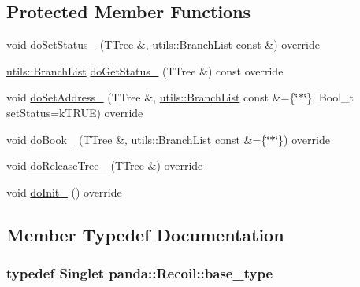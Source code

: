 \subsection*{Protected Member Functions}
\begin{DoxyCompactItemize}
\item 
void \hyperlink{classpanda_1_1Recoil_a68fa34c56d13dae0010ad93e1092ca4f}{doSetStatus\_\-} (TTree \&, \hyperlink{classpanda_1_1utils_1_1BranchList}{utils::BranchList} const \&) override
\item 
\hyperlink{classpanda_1_1utils_1_1BranchList}{utils::BranchList} \hyperlink{classpanda_1_1Recoil_ad20acbe1a9a80eabffbab6bca8d99d24}{doGetStatus\_\-} (TTree \&) const override
\item 
void \hyperlink{classpanda_1_1Recoil_a5e8d6c728a38c695643399c984eff1de}{doSetAddress\_\-} (TTree \&, \hyperlink{classpanda_1_1utils_1_1BranchList}{utils::BranchList} const \&=\{\char`\"{}$\ast$\char`\"{}\}, Bool\_\-t setStatus=kTRUE) override
\item 
void \hyperlink{classpanda_1_1Recoil_a95cbff28d37c2ec9995210ef0821d351}{doBook\_\-} (TTree \&, \hyperlink{classpanda_1_1utils_1_1BranchList}{utils::BranchList} const \&=\{\char`\"{}$\ast$\char`\"{}\}) override
\item 
void \hyperlink{classpanda_1_1Recoil_aafbaf725b3422789edfa8eb17e6f7a52}{doReleaseTree\_\-} (TTree \&) override
\item 
void \hyperlink{classpanda_1_1Recoil_a5f402f90e82af5ced6c1bc0be412e1a8}{doInit\_\-} () override
\end{DoxyCompactItemize}


\subsection{Member Typedef Documentation}
\hypertarget{classpanda_1_1Recoil_ab6016b3cfb0efc204a7eb40394e67442}{
\subsubsection[{base\_\-type}]{\setlength{\rightskip}{0pt plus 5cm}typedef {\bf Singlet} {\bf panda::Recoil::base\_\-type}}}
\label{classpanda_1_1Recoil_ab6016b3cfb0efc204a7eb40394e67442}


